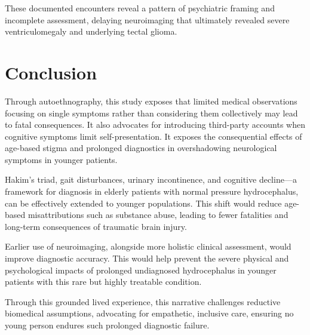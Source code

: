 \documentclass{article}
\begin{document}


These documented encounters reveal a pattern of psychiatric framing and incomplete assessment, delaying neuroimaging that ultimately revealed severe ventriculomegaly and underlying tectal glioma.

\section*{Conclusion}
Through autoethnography, this study exposes that limited medical observations focusing on single symptoms rather than considering them collectively may lead to fatal consequences. It also advocates for introducing third-party accounts when cognitive symptoms limit self-presentation. It exposes the consequential effects of age-based stigma and prolonged diagnostics in overshadowing neurological symptoms in younger patients.

Hakim’s triad, gait disturbances, urinary incontinence, and cognitive decline---a framework for diagnosis in elderly patients with normal pressure hydrocephalus, can be effectively extended to younger populations. This shift would reduce age-based misattributions such as substance abuse, leading to fewer fatalities and long-term consequences of traumatic brain injury.

Earlier use of neuroimaging, alongside more holistic clinical assessment, would improve diagnostic accuracy. This would help prevent the severe physical and psychological impacts of prolonged undiagnosed hydrocephalus in younger patients with this rare but highly treatable condition.

Through this grounded lived experience, this narrative challenges reductive biomedical assumptions, advocating for empathetic, inclusive care, ensuring no young person endures such prolonged diagnostic failure.



\end{document}
